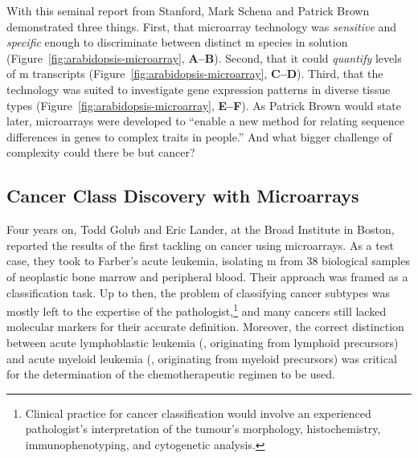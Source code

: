 With this seminal report from Stanford, Mark Schena and Patrick Brown
demonstrated three things.  First, that microarray technology was
\emph{sensitive} and \emph{specific} enough to discriminate between
distinct m species in solution
(Figure~\ref{fig:arabidopsis-microarray}, \textbf{A--B}).  Second,
that it could \emph{quantify} levels of m transcripts
(Figure~\ref{fig:arabidopsis-microarray}, \textbf{C--D}).  Third, that
the technology was suited to investigate gene expression patterns in
diverse tissue types (Figure~\ref{fig:arabidopsis-microarray},
\textbf{E--F}).  As Patrick Brown would state later, microarrays were
developed to ``enable a new method for relating sequence differences
in genes to complex traits in people.''  And what bigger challenge of
complexity could there be but cancer?

\subsection{Cancer Class Discovery with Microarrays}
\label{sec:class-discovery}

Four years on, Todd Golub and Eric Lander, at the Broad Institute in Boston,
reported the results of the first tackling on cancer using
microarrays.\cite{golub_molecular_1999} As a test case, they took to Farber's
acute leukemia, isolating m from 38 biological samples of
neoplastic bone marrow and peripheral blood. Their approach was framed as a
classification task.  Up to then, the problem of classifying cancer subtypes was
mostly left to the expertise of the pathologist,\footnote{Clinical practice for
  cancer classification would involve an experienced pathologist's
  interpretation of the tumour's morphology, histochemistry, immunophenotyping,
  and cytogenetic analysis.} and many cancers still lacked molecular markers for
their accurate definition.  Moreover, the correct distinction between acute
lymphoblastic leukemia (, originating from lymphoid precursors)
and acute myeloid leukemia (, originating from myeloid
precursors) was critical for the determination of the chemotherapeutic regimen
to be used.


